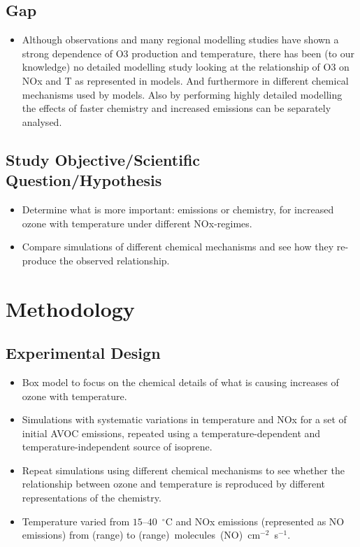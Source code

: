 \documentclass[11pt,a4paper]{article}
\begin{document}
\subsection{Gap}
\begin{itemize}
    \item Although observations and many regional modelling studies have shown a strong dependence of O3 production and temperature, there has been (to our knowledge) no detailed modelling study looking at the relationship of O3 on NOx and T as represented in models. And furthermore in different chemical mechanisms used by models. Also by performing highly detailed modelling the effects of faster chemistry and increased emissions can be separately analysed.
\end{itemize}

\subsection{Study Objective/Scientific Question/Hypothesis}
\begin{itemize}
    \item Determine what is more important: emissions or chemistry, for increased ozone with temperature under different NOx-regimes.
    \item Compare simulations of different chemical mechanisms and see how they re-produce the observed relationship.
\end{itemize}

\section{Methodology} \label{s:methodology}
\subsection{Experimental Design}
\begin{itemize}
    \item Box model to focus on the chemical details of what is causing increases of ozone with temperature.
    \item Simulations with systematic variations in temperature and NOx for a set of initial AVOC emissions, repeated using a temperature-dependent and temperature-independent source of isoprene.
    \item Repeat simulations using different chemical mechanisms to see whether the relationship between ozone and temperature is reproduced by different representations of the chemistry.
    \item Temperature varied from $15$--$40$~$^{\circ}$C and NOx emissions (represented as NO emissions) from (range) to (range)~molecules~(NO)~cm$^{-2}$~s$^{-1}$.
\end{itemize}
\end{document}
